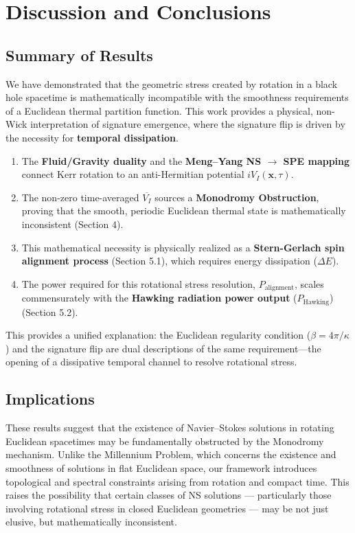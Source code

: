 \documentclass[11pt]{article}
\begin{document}
\section{Discussion and Conclusions}

\subsection{Summary of Results}

We have demonstrated that the geometric stress created by rotation in a black hole spacetime is mathematically incompatible with the smoothness requirements of a Euclidean thermal partition function. This work provides a physical, non-Wick interpretation of signature emergence, where the signature flip is driven by the necessity for \textbf{temporal dissipation}.
\begin{enumerate}
\item The \textbf{Fluid/Gravity duality} and the \textbf{Meng--Yang NS $\to$ SPE mapping} connect Kerr rotation to an anti-Hermitian potential $iV_I(\mathbf{x}, \tau)$.
\item The non-zero time-averaged $\overline{V_I}$ sources a \textbf{Monodromy Obstruction}, proving that the smooth, periodic Euclidean thermal state is mathematically inconsistent (Section 4).
\item This mathematical necessity is physically realized as a \textbf{Stern-Gerlach\cite{SternGerlach1922} spin alignment process} (Section 5.1), which requires energy dissipation ($\Delta E$).

\item The power required for this rotational stress resolution, $P_{\text{alignment}}$, scales commensurately with the \textbf{Hawking radiation\cite{Hawking1975} power output} ($P_{\text{Hawking}}$) (Section 5.2).
\end{enumerate}
This provides a unified explanation: the Euclidean regularity condition ($\beta = 4\pi/\kappa$) and the signature flip are dual descriptions of the same requirement—the opening of a dissipative temporal channel to resolve rotational stress.

\subsection{Implications}

These results suggest that the existence of Navier–Stokes solutions in rotating Euclidean spacetimes may be fundamentally obstructed by the Monodromy mechanism. Unlike the Millennium Problem, which concerns the existence and smoothness of solutions in flat Euclidean space, our framework introduces topological and spectral constraints arising from rotation and compact time. This raises the possibility that certain classes of NS solutions — particularly those involving rotational stress in closed Euclidean geometries — may be not just elusive, but mathematically inconsistent.
\end{document}
